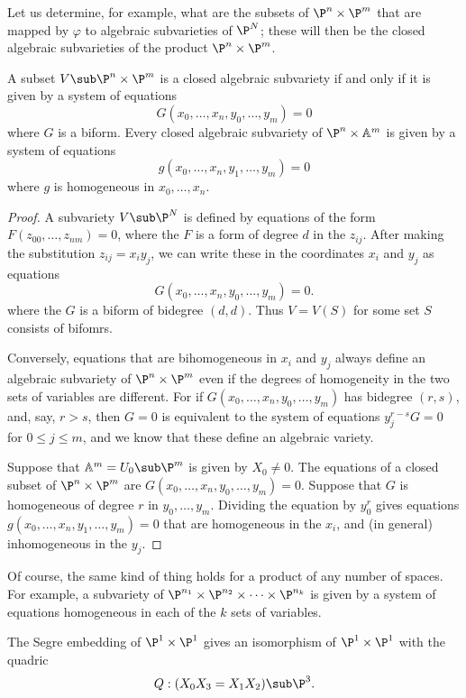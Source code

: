 Let us determine, for example, what are the subsets of $\P^n\times\P^m$ that are mapped by $\varphi$ to algebraic subvarieties of $\P^N$; these will then be the closed algebraic subvarieties of the product $\P^n\times\P^m$.
\begin{proposition}
A subset $V\sub\P^n\times\P^m$ is a closed algebraic subvariety if and only if it is given by a system of equations
\[G(x_0,\dots,x_n,y_0,\dots,y_m)=0\]
where $G$ is a biform. Every closed algebraic subvariety of $\P^n\times\mathbb{A}^m$ is given by a system of equations
\[g(x_0,\dots,x_n,y_1,\dots,y_m)=0\]
where $g$ is homogeneous in $x_0,\dots,x_n$.
\end{proposition}
\begin{proof}
A subvariety $V\sub\P^N$ is defined by equations of the form $F(z_{00},\dots,z_{nm})=0$, where the $F$ is a form of degree $d$ in the $z_{ij}$. After making the substitution $z_{ij}=x_iy_j$, we can write these in the coordinates $x_i$ and $y_j$ as equations
\[G(x_0,\dots,x_n,y_0,\dots,y_m)=0.\]
where the $G$ is a biform of bidegree $(d,d)$. Thus $V=V(S)$ for some set $S$ consists of bifomrs.\par
Conversely, equations that are bihomogeneous in $x_i$ and $y_j$ always define an algebraic subvariety of $\P^n\times\P^m$ even if the degrees of homogeneity in the two sets of variables are different. For if $G(x_0,\dots,x_n,y_0,\dots,y_m)$ has bidegree $(r,s)$, and, say, $r>s$, then $G=0$ is equivalent to the system of equations $y_j^{r-s}G=0$ for $0\leq j\leq m$, and we know that these define an algebraic variety.\par
Suppose that $\mathbb{A}^m=U_0\sub\P^m$ is given by $X_0\neq0$. The equations of a closed subset of $\P^n\times\P^m$ are $G(x_0,\dots,x_n,y_0,\dots,y_m)=0$. Suppose that $G$ is homogeneous of degree $r$ in $y_0,\dots,y_m$. Dividing the equation by $y_0^r$ gives equations $g(x_0,\dots,x_n,y_1,\dots,y_m)=0$ that are homogeneous in the $x_i$, and (in general) inhomogeneous in the $y_j$.
\end{proof}
Of course, the same kind of thing holds for a product of any number of spaces.
For example, a subvariety of $\P^{n_1}\times\P^{n_2}\times\cdots\times\P^{n_k}$ is given by a system of equations homogeneous in each of the $k$ sets of variables.
\begin{example}
The Segre embedding of $\P^1\times\P^1$ gives an isomorphism of $\P^1\times\P^1$ with the quadric 
\[Q:(X_0X_3=X_1X_2)\sub\P^3.\]
\end{example}
